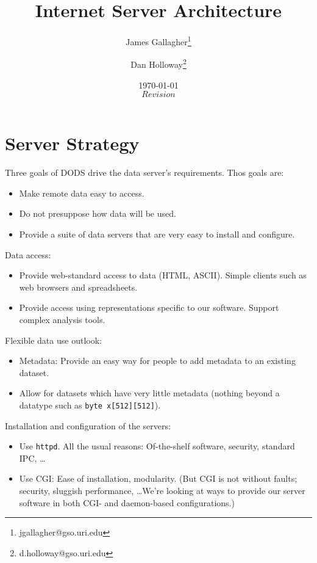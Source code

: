 \documentclass{article}
\newcommand{\httpd}{\texttt{httpd}\xspace}
\begin{document}
\title{Internet Server Architecture}
\author{James Gallagher\thanks{jgallagher@gso.uri.edu}
  \and Dan Holloway\thanks{d.holloway@gso.uri.edu}}
\date{\today \\ $Revision$ }

\maketitle
\tableofcontents

\section{Server Strategy}
\label{sec:strategy}

Three goals of DODS drive the data server's requirements. Thos goals are:
\begin{itemize}
\item Make remote data easy to access.

\item Do not presuppose how data will be used.

\item Provide a suite of data servers that are very easy to install and
  configure.
\end{itemize}

Data access:
\begin{itemize}
\item Provide web-standard access to data (HTML, ASCII). Simple clients such
  as web browsers and spreadsheets.

\item Provide access using representations specific to our software. Support
  complex analysis tools.
\end{itemize}

Flexible data use outlook:
\begin{itemize}
\item Metadata: Provide an easy way for people to add metadata to an existing
  dataset.
  
\item Allow for datasets which have very little metadata (nothing beyond a
  datatype such as \texttt{byte x[512][512]}).
\end{itemize}

Installation and configuration of the servers:
\begin{itemize}
\item Use \httpd. All the usual reasons: Of-the-shelf software, security,
  standard IPC, \ldots
  
\item Use CGI: Ease of installation, modularity. (But CGI is not without
  faults; security, sluggish performance, \ldots We're looking at ways to
  provide our server software in both CGI- and daemon-based configurations.)
\end{itemize}
\end{document}
